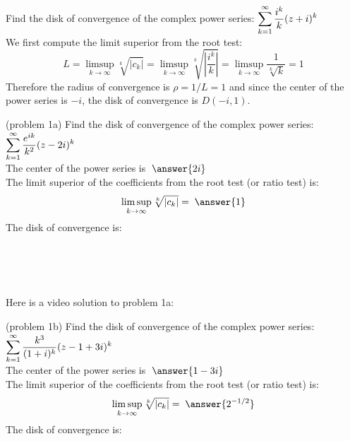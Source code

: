 \documentclass[handout]{ximera}
\begin{document}
\begin{example}[example 1]
Find the disk of convergence of the complex power series: $\displaystyle \sum_{k=1}^\infty \frac{i^k}{k}(z+i)^k$\\
We first compute the limit superior from the root test:
\[
L = \limsup_{k \to \infty} \sqrt[k]{|c_k|} = \limsup_{k \to \infty} \sqrt[k]{\left|\frac{i^k}{k}\right|} = \limsup_{k \to \infty} \frac{1}{\sqrt[k]{k}} = 1
\]
Therefore the radius of convergence is $\rho = 1/L = 1$ and since the center of the power series is $-i$, the disk of convergence is $D(-i, 1)$.
\end{example}

\begin{problem}(problem 1a)
Find the disk of convergence of the complex power series: $\displaystyle \sum_{k=1}^\infty \frac{e^{ik}}{k^2}(z-2i)^k$\\
The center of the power series is $\; \answer{2i}$\\
The limit superior of the coefficients from the root test (or ratio test) is:
\[
\limsup_{k \to \infty} \sqrt[k]{|c_k|} = \; \answer{1}
\]
The disk of convergence is:
\begin{multipleChoice}
\\
\\
\\
\end{multipleChoice}
\end{problem}

Here is a video solution to problem 1a:\\
\begin{foldable}
\end{foldable}

\begin{problem}(problem 1b)
    Find the disk of convergence of the complex power series: $\displaystyle \sum_{k=1}^\infty \frac{k^3}{(1+i)^k}(z-1+3i)^k$\\
    The center of the power series is $\; \answer{1-3i}$\\
    The limit superior of the coefficients from the root test (or ratio test) is:
    \[
    \limsup_{k \to \infty} \sqrt[k]{|c_k|} = \; \answer{2^{-1/2}}
    \]
    The disk of convergence is:
    \begin{multipleChoice}
    \\
    \\
    \\
    \end{multipleChoice}
    \end{problem}
\end{document}
